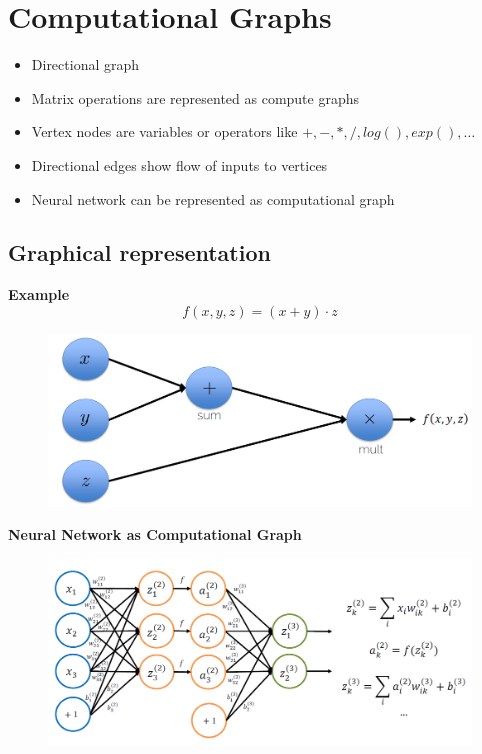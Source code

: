 \documentclass[10pt,a4paper]{article}
\begin{document}
\section{Computational Graphs}
\begin{itemize}
	\item Directional graph
	\item Matrix operations are represented as compute graphs
	\item Vertex nodes are variables or operators like $+, -, *, /, log(), exp(), \dots$
	\item Directional edges show flow of inputs to vertices
	\item Neural network can be represented as computational graph
\end{itemize}

\subsection{Graphical representation}
\textbf{Example}
$$
	f(x, y, z) = (x + y) ⋅ z
$$
\begin{figure}[H]
	\includegraphics[width=\columnwidth]{figures/comp_graph.png}
\end{figure}

\textbf{Neural Network as Computational Graph}
\begin{figure}[H]
	\includegraphics[width=\columnwidth]{figures/comp_graph_nn.png}
\end{figure}
\end{document}
